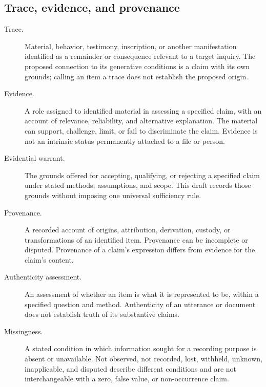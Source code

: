 \documentclass[11pt,a4paper]{article}
\begin{document}

\subsection{Trace, evidence, and provenance}
\begin{description}
\item[Trace.] Material, behavior, testimony, inscription, or another manifestation identified as a remainder or consequence relevant to a target inquiry. The proposed connection to its generative conditions is a claim with its own grounds; calling an item a trace does not establish the proposed origin.
\item[Evidence.] A role assigned to identified material in assessing a specified claim, with an account of relevance, reliability, and alternative explanation. The material can support, challenge, limit, or fail to discriminate the claim. Evidence is not an intrinsic status permanently attached to a file or person.
\item[Evidential warrant.] The grounds offered for accepting, qualifying, or rejecting a specified claim under stated methods, assumptions, and scope. This draft records those grounds without imposing one universal sufficiency rule.
\item[Provenance.] A recorded account of origins, attribution, derivation, custody, or transformations of an identified item. Provenance can be incomplete or disputed. Provenance of a claim's expression differs from evidence for the claim's content.
\item[Authenticity assessment.] An assessment of whether an item is what it is represented to be, within a specified question and method. Authenticity of an utterance or document does not establish truth of its substantive claims.
\item[Missingness.] A stated condition in which information sought for a recording purpose is absent or unavailable. Not observed, not recorded, lost, withheld, unknown, inapplicable, and disputed describe different conditions and are not interchangeable with a zero, false value, or non-occurrence claim.
\end{description}

\end{document}
